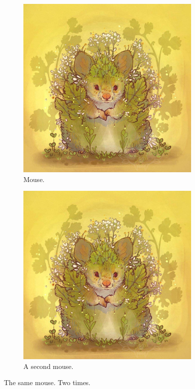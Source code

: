 \documentclass{article}
\begin{document}
\begin{figure}[H]
  \centering
  \begin{subfigure}[b]{0.4\linewidth}
    \includegraphics[width=\linewidth]{mouse.jpg}
    \caption{Mouse.}
  \end{subfigure}
  \begin{subfigure}[b]{0.4\linewidth}
    \includegraphics[width=\linewidth]{mouse.jpg}
    \caption{A second mouse.}
  \end{subfigure}
  \caption{The same mouse. Two times.}
  \label{fig:mouse}
\end{figure}
\end{document}
